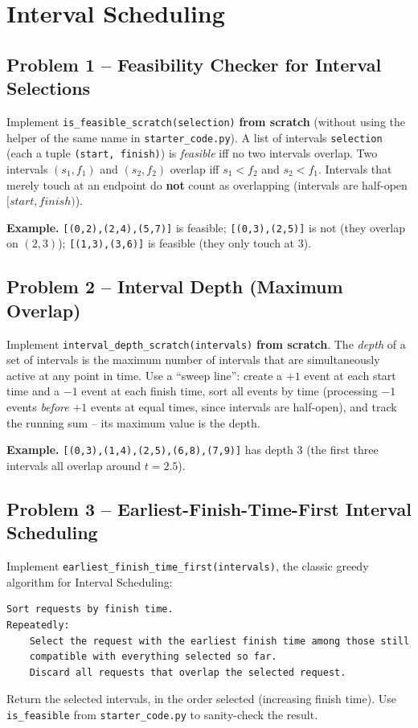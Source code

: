 \documentclass[11pt]{article}
\begin{document}
\section{Interval Scheduling}

\subsection*{Problem 1 -- Feasibility Checker for Interval Selections}

Implement \texttt{is\_feasible\_scratch(selection)} \textbf{from scratch} (without using
the helper of the same name in \texttt{starter\_code.py}). A list of intervals
\texttt{selection} (each a tuple \texttt{(start, finish)}) is \emph{feasible} iff no two
intervals overlap. Two intervals $(s_1,f_1)$ and $(s_2,f_2)$ overlap iff $s_1 < f_2$ and
$s_2 < f_1$. Intervals that merely touch at an endpoint do \textbf{not} count as
overlapping (intervals are half-open $[start, finish)$).

\textbf{Example.} \texttt{[(0,2),(2,4),(5,7)]} is feasible; \texttt{[(0,3),(2,5)]} is not
(they overlap on $(2,3)$); \texttt{[(1,3),(3,6)]} is feasible (they only touch at $3$).

\subsection*{Problem 2 -- Interval Depth (Maximum Overlap)}

Implement \texttt{interval\_depth\_scratch(intervals)} \textbf{from scratch}. The
\emph{depth} of a set of intervals is the maximum number of intervals that are
simultaneously active at any point in time. Use a ``sweep line'': create a $+1$ event at
each start time and a $-1$ event at each finish time, sort all events by time (processing
$-1$ events \emph{before} $+1$ events at equal times, since intervals are half-open), and
track the running sum -- its maximum value is the depth.

\textbf{Example.} \texttt{[(0,3),(1,4),(2,5),(6,8),(7,9)]} has depth $3$ (the first three
intervals all overlap around $t=2.5$).

\subsection*{Problem 3 -- Earliest-Finish-Time-First Interval Scheduling}

Implement \texttt{earliest\_finish\_time\_first(intervals)}, the classic greedy algorithm
for Interval Scheduling:
\begin{verbatim}
Sort requests by finish time.
Repeatedly:
    Select the request with the earliest finish time among those still
    compatible with everything selected so far.
    Discard all requests that overlap the selected request.
\end{verbatim}
Return the selected intervals, in the order selected (increasing finish time). Use
\texttt{is\_feasible} from \texttt{starter\_code.py} to sanity-check the result.
\end{document}
